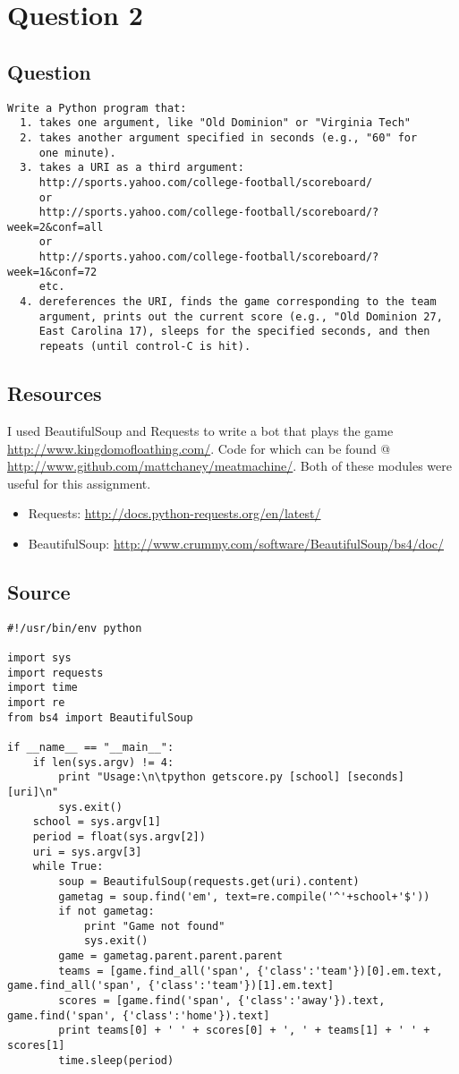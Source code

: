 \section{Question 2}

\subsection{Question}
\begin{verbatim}
Write a Python program that:
  1. takes one argument, like "Old Dominion" or "Virginia Tech"
  2. takes another argument specified in seconds (e.g., "60" for 
     one minute).
  3. takes a URI as a third argument: 
     http://sports.yahoo.com/college-football/scoreboard/
     or
     http://sports.yahoo.com/college-football/scoreboard/?week=2&conf=all
     or
     http://sports.yahoo.com/college-football/scoreboard/?week=1&conf=72
     etc.
  4. dereferences the URI, finds the game corresponding to the team
     argument, prints out the current score (e.g., "Old Dominion 27, 
     East Carolina 17), sleeps for the specified seconds, and then
     repeats (until control-C is hit).
\end{verbatim}

\subsection{Resources}
I used BeautifulSoup and Requests to write a bot that plays the game \url{http://www.kingdomofloathing.com/}.
Code for which can be found @ \url{http://www.github.com/mattchaney/meatmachine/}.
Both of these modules were useful for this assignment. 

\begin{itemize}
\item Requests: \url{http://docs.python-requests.org/en/latest/}
\item BeautifulSoup: \url{http://www.crummy.com/software/BeautifulSoup/bs4/doc/}
\end{itemize}

\subsection{Source}
\lstset{
	language=Python,
}
\begin{lstlisting}
#!/usr/bin/env python

import sys
import requests
import time
import re
from bs4 import BeautifulSoup

if __name__ == "__main__":
	if len(sys.argv) != 4:
		print "Usage:\n\tpython getscore.py [school] [seconds] [uri]\n"
		sys.exit()
	school = sys.argv[1]
	period = float(sys.argv[2])
	uri = sys.argv[3]
	while True:
		soup = BeautifulSoup(requests.get(uri).content)
		gametag = soup.find('em', text=re.compile('^'+school+'$'))
		if not gametag:
			print "Game not found"
			sys.exit()
		game = gametag.parent.parent.parent
		teams = [game.find_all('span', {'class':'team'})[0].em.text, game.find_all('span', {'class':'team'})[1].em.text]
		scores = [game.find('span', {'class':'away'}).text, game.find('span', {'class':'home'}).text]
		print teams[0] + ' ' + scores[0] + ', ' + teams[1] + ' ' + scores[1]
		time.sleep(period)
\end{lstlisting}

